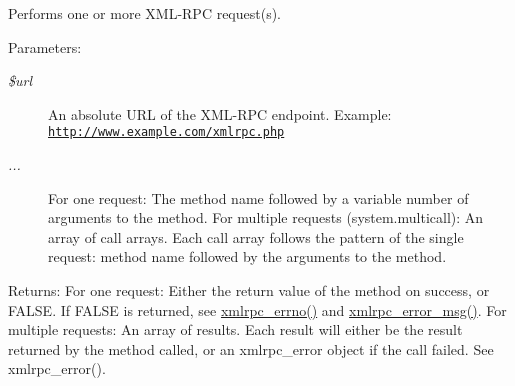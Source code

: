 Performs one or more XML-RPC request(s).

\begin{Desc}
\item[Parameters:]
\begin{description}
\item[{\em \$url}]An absolute URL of the XML-RPC endpoint. Example: \href{http://www.example.com/xmlrpc.php}{\tt http://www.example.com/xmlrpc.php} \item[{\em ...}]For one request: The method name followed by a variable number of arguments to the method. For multiple requests (system.multicall): An array of call arrays. Each call array follows the pattern of the single request: method name followed by the arguments to the method. \end{description}
\end{Desc}
\begin{Desc}
\item[Returns:]For one request: Either the return value of the method on success, or FALSE. If FALSE is returned, see \hyperlink{xmlrpc_8inc_f9d29505279c00e66545f3859550ff88}{xmlrpc\_\-errno()} and \hyperlink{xmlrpc_8inc_baf990108687e6e764164984306dbd55}{xmlrpc\_\-error\_\-msg()}. For multiple requests: An array of results. Each result will either be the result returned by the method called, or an xmlrpc\_\-error object if the call failed. See xmlrpc\_\-error(). \end{Desc}
